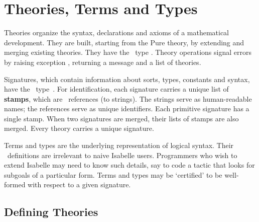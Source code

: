 
\chapter{Theories, Terms and Types} \label{theories}
Theories organize the syntax, declarations and axioms of a mathematical
development.  They are built, starting from the Pure theory, by extending
and merging existing theories.  They have the \ML\ type .
Theory operations signal errors by raising exception ,
returning a message and a list of theories.

Signatures, which contain information about sorts, types, constants and
syntax, have the \ML\ type~.  For identification,
each signature carries a unique list of {\bf stamps}, which are \ML\
references (to strings).  The strings serve as human-readable names; the
references serve as unique identifiers.  Each primitive signature has a
single stamp.  When two signatures are merged, their lists of stamps are
also merged.  Every theory carries a unique signature.

Terms and types are the underlying representation of logical syntax.  Their
\ML\ definitions are irrelevant to naive Isabelle users.  Programmers who
wish to extend Isabelle may need to know such details, say to code a tactic
that looks for subgoals of a particular form.  Terms and types may be
`certified' to be well-formed with respect to a given signature.

\section{Defining Theories}
\label{DefiningTheories}

